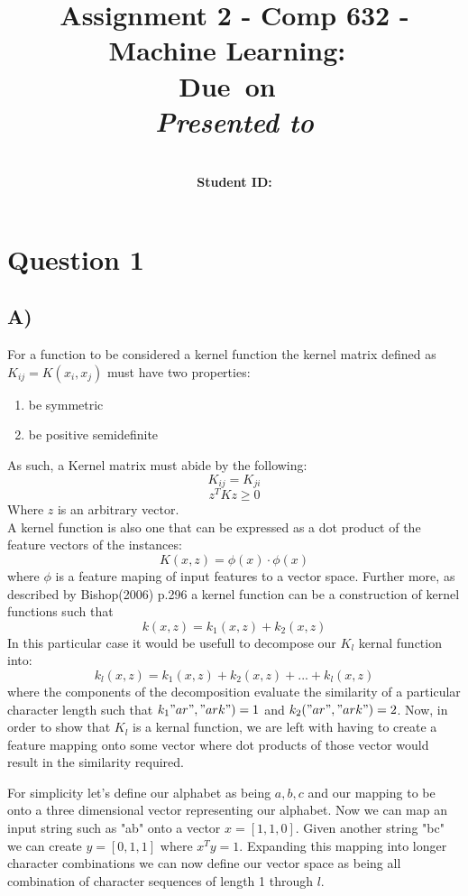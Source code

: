 \documentclass{report}
\title{Assignment 2 - Comp 632 - Machine Learning}
\title{\vspace{2in}\textmd{\textbf{\hmwkClass:\ \hmwkTitle}}\\
\normalsize\vspace{0.1in}\small{Due\ on\ \hmwkDueDate}\\
\vspace{0.1in}\large{\textit{Presented to \hmwkClassInstructor}}\vspace{3in}}
\date{}
\author{\textbf{\hmwkAuthorName}\\
    \textbf{Student ID: \hmwkAuthorNumber}}
\begin{document}
\maketitle
\section*{Question 1}
\subsection*{A)}
For a function to be considered a kernel function the kernel matrix defined as
$K_{ij}=K(x_i,x_j)$ must have two properties:
\begin{enumerate}
  \item be symmetric
  \item be positive semidefinite
\end{enumerate}
As such, a Kernel matrix must abide by the following:
\begin{equation}
  K_{ij} = K_{ji}
\end{equation}
\begin{equation}
  z^{T}Kz\geq 0
\end{equation}
Where $z$ is an arbitrary vector. \\

A kernel function is also one that can be expressed as a dot product of the feature
vectors of the instances:
\begin{equation}
  K(x,z) = \phi (x) \cdot \phi (x)
\end{equation}
where $\phi$ is a feature maping of input features to a vector space. Further more,
as described by Bishop(2006) p.296 a kernel function can be a construction of kernel
functions such that
\begin{equation}
  k(x,z) = k_1(x,z) + k_2(x,z)
\end{equation}
In this particular case it would be usefull to decompose our $K_l$ kernal function
into:
\begin{equation}
  k_l(x,z) = k_1(x,z) + k_2(x,z) + ... + k_l(x,z)
\end{equation}
where the components of the decomposition evaluate the similarity of a particular
character length such that $k_1"ar","ark")=1$ and $k_2("ar","ark")=2$. Now, in order
to show that $K_l$ is a kernal function, we are left with having to create a feature
mapping onto some vector where dot products of those vector would result in the
similarity required.

For simplicity let's define our alphabet as being ${a,b,c}$
and our mapping to be onto a three dimensional vector representing our alphabet.
Now we can map an input string such as "ab" onto a vector $x=[1,1,0]$. Given another
string "bc" we can create $y=[0,1,1]$ where $x^Ty=1$. Expanding this mapping into
longer character combinations we can now define our vector space as being all combination
of character sequences of length 1 through $l$.
\end{document}
